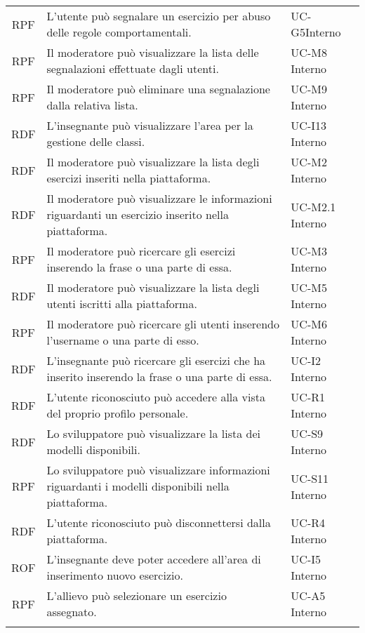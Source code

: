 \begin{tabularx}{\textwidth}{| c | p{10cm} | X |}
		RPF & L'utente può segnalare un esercizio per abuso delle regole comportamentali. & UC-G5\newline Interno\\
		RPF & Il moderatore può visualizzare la lista delle segnalazioni effettuate dagli utenti. & UC-M8 \newline Interno\\
		RPF & Il moderatore può eliminare una segnalazione dalla relativa lista. & UC-M9 \newline Interno\\
		RDF & L'insegnante può visualizzare l'area per la gestione delle classi. & UC-I13 \newline Interno\\
		RDF & Il moderatore può visualizzare la lista degli esercizi inseriti nella piattaforma. & UC-M2 \newline Interno\\
		RDF & Il moderatore può visualizzare le informazioni riguardanti un esercizio inserito nella piattaforma. & UC-M2.1 \newline Interno\\
		RPF & Il moderatore può ricercare gli esercizi inserendo la frase o una parte di essa. & UC-M3 \newline Interno\\
		RDF & Il moderatore può visualizzare la lista degli utenti iscritti alla piattaforma. & UC-M5 \newline Interno\\
		RPF & Il moderatore può ricercare gli utenti inserendo l'username o una parte di esso. & UC-M6 \newline Interno\\
		RDF & L'insegnante può ricercare gli esercizi che ha inserito inserendo la frase o una parte di essa. & UC-I2 \newline Interno\\
		RDF & L'utente riconosciuto può accedere alla vista del proprio profilo personale. & UC-R1 \newline Interno\\
		RDF & Lo sviluppatore può visualizzare la lista dei modelli disponibili. & UC-S9 \newline Interno\\
		RPF & Lo sviluppatore può visualizzare informazioni riguardanti i modelli disponibili nella piattaforma. & UC-S11 \newline Interno\\
		RDF & L'utente riconosciuto può disconnettersi dalla piattaforma. & UC-R4 \newline Interno\\
		ROF & L'insegnante deve poter accedere all'area di inserimento nuovo esercizio. & UC-I5 \newline Interno\\
		RPF & L'allievo può selezionare un esercizio assegnato. & UC-A5 \newline Interno\\
		\hline
		\caption{Tabella dei requisiti funzionali}
\end{tabularx}

